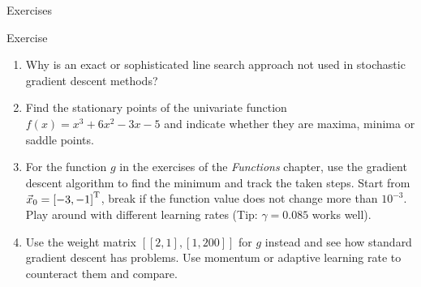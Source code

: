   \begin{frame}{Exercises}
    \begin{exampleblock}{Exercise}
      \begin{enumerate}
        \item Why is an exact or sophisticated line search approach not used in stochastic gradient descent methods?
        \item Find the stationary points of the univariate function $f(x) = x^3 + 6x^2 - 3x - 5$ and indicate whether they are maxima, minima or saddle points.
        \item For the function $g$ in the exercises of the \emph{Functions} chapter, use the gradient descent algorithm to find the minimum and track the taken steps. Start from $\vec{x}_0 = \left[-3, -1\right]^{\text{T}}$, break if the function value does not change more than $10^{-3}$.
        Play around with different learning rates (Tip: $\gamma = 0.085$ works well).
        \item Use the weight matrix $[[2, 1], [1, 200]]$ for $g$ instead and see how standard gradient descent has problems. Use momentum or adaptive learning rate to counteract them and compare.
      \end{enumerate}
    \end{exampleblock}
  \end{frame}


